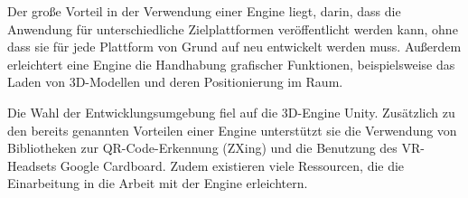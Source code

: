 Der große Vorteil in der Verwendung einer Engine liegt, darin, dass die Anwendung für unterschiedliche Zielplattformen veröffentlicht werden kann, ohne dass sie für jede Plattform von Grund auf neu entwickelt werden muss. Außerdem erleichtert eine Engine die Handhabung grafischer Funktionen, beispielsweise das Laden von 3D-Modellen und deren Positionierung im Raum.

Die Wahl der Entwicklungsumgebung fiel auf die 3D-Engine Unity. Zusätzlich zu den bereits genannten Vorteilen einer Engine unterstützt sie die Verwendung von Bibliotheken zur QR-Code-Erkennung (ZXing) und die Benutzung des VR-Headsets Google Cardboard. Zudem existieren viele Ressourcen, die die Einarbeitung in die Arbeit mit der Engine erleichtern.

